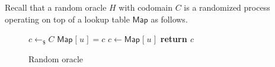 \documentclass[psamsfonts, reqno]{amsart}
\theoremstyle{definition}
\theoremstyle{remark}
\numberwithin{equation}{section}
\begin{document}
Recall that a random oracle $H$ with codomain $C$
is a randomized process operating on top of
a lookup table $\mathsf{Map}$ as follows.

\begin{figure}[H]
\begin{minipage}{0.42\textwidth}
\begin{algorithm}[H]
    \centering
    \caption{$H(u)$}\label{random_oracle}
    \begin{algorithmic}
        \vspace{3pt}
        	\State
        		$c \leftarrow_\$ C$\vspace{4pt}
        	\State
        		$\mathsf{Map}\hspace{1pt}
        		[\hspace{1pt}u\hspace{1pt}] = c$
        \Else
        	\State
        		$c \leftarrow \mathsf{Map}
        		\hspace{1pt}[\hspace{1pt}u\hspace{1pt}]$
        \EndIf
        \State \textbf{return $c$}
    \end{algorithmic}
\end{algorithm}
\vspace{0pt}
\end{minipage}
\caption{Random oracle}
\label{fig_random_oracle}
\end{figure}
\hfill
\end{document}
